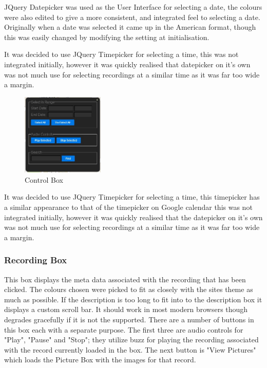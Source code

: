 \documentclass{l3proj}
\begin{document}
JQuery Datepicker was used as the User Interface for selecting a date, the colours were also edited to give a more consistent, and integrated feel to selecting a date. Originally when a date was selected it came up in the American format, though this was easily changed by modifying the setting at initialisation.

It was decided to use JQuery Timepicker for selecting a time, this was not integrated initially, however it was quickly realised that datepicker on it's own was not much use for selecting recordings at a similar time as it was far too wide a margin.

\begin{figure}[ht!]
\centering
\includegraphics[width=0.35\textwidth]{images/ctrl-box.jpg}
\caption{Control Box}
\end{figure}

It was decided to use JQuery Timepicker for selecting a time, this timepicker has a similar appearance to that of the timepicker on Google calendar this was not integrated initially, however it was quickly realised that the datepicker on it's own was not much use for selecting recordings at a similar time as it was far too wide a margin.

\subsubsection{Recording Box}

This box displays the meta data associated with the recording that has been clicked. The colours chosen were picked to fit as closely with the sites theme as much as possible. If the description is too long to fit into to the description box it displays a custom  scroll bar. It should work in most modern browsers though degrades gracefully if it is not the supported. There are a number of buttons in this box each with a separate purpose. The first three are audio controls for "Play", "Pause" and "Stop"; they utilize buzz for playing the recording associated with the record currently loaded in the box. The next button is "View Pictures" which loads the Picture Box with the images for that record.
\end{document}

